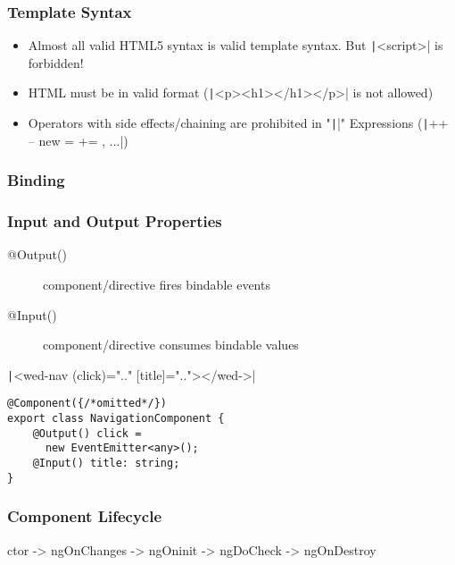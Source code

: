 \begin{multicols*}{4}
\subsubsection{Template Syntax}
\begin{itemize}
    \item Almost all valid HTML5 syntax is valid template syntax. But \texttt|<script>| is forbidden!
    \item HTML must be in valid format (\texttt|<p><h1></h1></p>| is not allowed)
    \item Operators with side effects/chaining are prohibited in "\texttt|{{}}|" Expressions (\texttt|++ -- new = += , ...|)
\end{itemize}

\subsubsection{Binding}

\subsubsection{Input and Output Properties}
\begin{description}
    \item[@Output()] component/directive fires bindable events
    \item[@Input()] component/directive consumes bindable values
\end{description}
\texttt|<wed-nav (click)=".." [title]=".."></wed->|
\begin{verbatim}
@Component({/*omitted*/})
export class NavigationComponent {
    @Output() click =
      new EventEmitter<any>();
    @Input() title: string;
}
\end{verbatim}

\subsubsection{Component Lifecycle}
ctor -> ngOnChanges -> ngOninit -> ngDoCheck -> ngOnDestroy


\end{multicols*}
